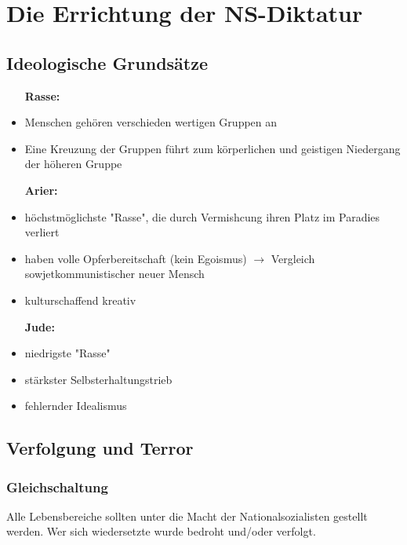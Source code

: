 \documentclass{article}
\begin{document}
\section*{Die Errichtung der NS-Diktatur }

\subsection*{Ideologische Grundsätze}

\begin{minipage}[t]{.33\textwidth}
    \begin{itemize}
        \item [\textbf{Rasse:}]
        \item Menschen gehören verschieden wertigen Gruppen an
        \item Eine Kreuzung der Gruppen führt zum körperlichen und geistigen Niedergang der höheren Gruppe
    \end{itemize}
\end{minipage}%
\begin{minipage}[t]{.33\textwidth}
    \begin{itemize}
        \item [\textbf{Arier:}]
        \item höchstmöglichste "Rasse", die durch Vermishcung ihren Platz im Paradies verliert
        \item haben volle Opferbereitschaft (kein Egoismus) $\rightarrow$ Vergleich sowjetkommunistischer neuer Mensch
        \item kulturschaffend kreativ
    \end{itemize}
\end{minipage}%
\begin{minipage}[t]{.33\textwidth}
    \begin{itemize}
        \item [\textbf{Jude:}]
        \item niedrigste "Rasse"
        \item stärkster Selbsterhaltungstrieb
        \item fehlernder Idealismus
    \end{itemize}
\end{minipage}

\subsection*{Verfolgung und Terror}
\subsubsection*{Gleichschaltung}
Alle Lebensbereiche sollten unter die Macht der Nationalsozialisten gestellt werden.
Wer sich wiedersetzte wurde bedroht und/oder verfolgt.
\end{document}

